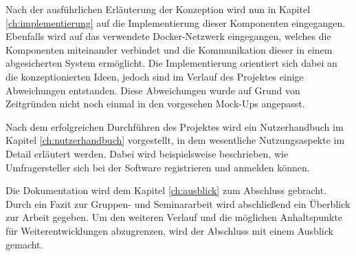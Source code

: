 Nach der ausführlichen Erläuterung der Konzeption wird nun in Kapitel \vref{ch:implementierung} auf die Implementierung dieser Komponenten eingegangen. 
Ebenfalls wird auf das verwendete Docker-Netzwerk eingegangen, welches die Komponenten miteinander verbindet und die Kommunikation dieser in einem abgesicherten System ermöglicht.
Die Implementierung orientiert sich dabei an die konzeptionierten Ideen, jedoch sind im Verlauf des Projektes einige Abweichungen entstanden.
Diese Abweichungen wurde auf Grund von Zeitgründen nicht noch einmal in den vorgesehen Mock-Ups angepasst.

Nach dem erfolgreichen Durchführen des Projektes wird ein Nutzerhandbuch im Kapitel \vref{ch:nutzerhandbuch} vorgestellt, in dem wesentliche Nutzungsaspekte im Detail erläutert werden.
Dabei wird beispielsweise beschrieben, wie Umfragersteller sich bei der Software registrieren und anmelden können.

Die Dokumentation wird dem Kapitel \vref{ch:ausblick} zum Abschluss gebracht. 
Durch ein Fazit zur Gruppen- und Seminararbeit wird abschließend ein Überblick zur Arbeit gegeben. 
Um den weiteren Verlauf und die möglichen Anhaltspunkte für Weiterentwicklungen abzugrenzen, wird der Abschluss mit einem Ausblick gemacht.